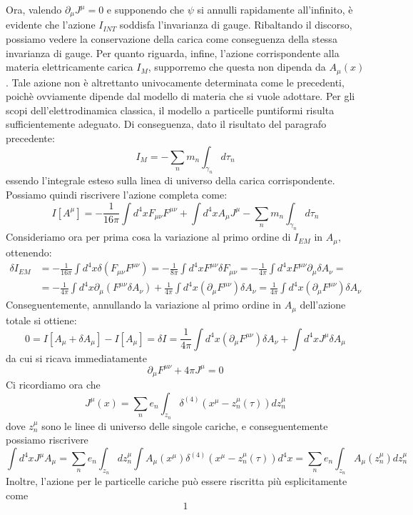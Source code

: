 \documentclass[a4paper,11pt]{book}
\theoremstyle{plain}
\theoremstyle{definition}
\begin{document}
Ora, valendo $\partial_{\mu}J^{\mu}=0$ e supponendo che $\psi$ si annulli rapidamente all'infinito, è evidente che l'azione $I_{INT}$ soddisfa l'invarianza di gauge. Ribaltando il discorso, possiamo vedere la conservazione della carica come conseguenza della stessa invarianza di gauge. Per quanto riguarda, infine, l'azione corrispondente alla materia elettricamente carica $I_M$, supporremo che questa non dipenda da $A_{\mu}(x)$. Tale azione non è altrettanto univocamente determinata come le precedenti, poichè ovviamente dipende dal modello di materia che si vuole adottare. Per gli scopi dell'elettrodinamica classica, il modello a particelle puntiformi risulta sufficientemente adeguato. Di conseguenza, dato il risultato del paragrafo precedente:
\[
I_M = -\sum_n m_n \int _{\gamma_n}d\tau_n
\] 
essendo l'integrale esteso sulla linea di universo della carica corrispondente. Possiamo quindi riscrivere l'azione completa come:
\[
I[A^{\mu}]=-\frac{1}{16\pi}\int d^4 xF_{\mu\nu}F^{\mu\nu}+\int d^4x A_{\mu}J^{\mu} -\sum_n m_n \int _{\gamma_n}d\tau_n
\]
Consideriamo ora per prima cosa la variazione al primo ordine di $I_{EM}$ in $A_{\mu}$, ottenendo:
\begin{align*}
\delta I_{EM} &= -\frac{1}{16\pi}\int d^4 x \delta(F_{\mu\nu}F^{\mu\nu}) = -\frac{1}{8\pi}\int d^4 x F^{\mu\nu}\delta F_{\mu\nu} = -\frac{1}{4\pi}\int d^4 x F^{\mu\nu}\partial_{\mu}\delta A_{\nu} = \\
&= -\frac{1}{4\pi}\int d^4 x\partial_{\mu}(F^{\mu\nu}\delta A_{\nu} ) + \frac{1}{4\pi}\int d^4x (\partial_{\mu}F^{\mu\nu})\delta A_{\nu} = \frac{1}{4\pi}\int d^4x (\partial_{\mu}F^{\mu\nu})\delta A_{\nu}
\end{align*}
Conseguentemente, annullando la variazione al primo ordine in $A_{\mu}$ dell'azione totale si ottiene:
\[
0 = I[A_{\mu}+\delta A_{\mu}] - I[A_{\mu}] = \delta I = \frac{1}{4\pi}\int d^4x (\partial_{\mu}F^{\mu\nu})\delta A_{\nu} + \int d^4 x J^{\mu}\delta A_{\mu}
\]
da cui si ricava immediatamente
\[
\partial_{\mu}F^{\mu\nu}+4\pi J^{\mu}=0
\]
Ci ricordiamo ora che 
\[
J^{\mu}(x) = \sum_n e_n \int _{z_n}\delta^{(4)}(x^{\mu}-z_n^{\mu}(\tau) ) dz_n^{\mu}
\]
dove $z_n^{\mu}$ sono le linee di universo delle singole cariche, e conseguentemente possiamo riscrivere
\[
\int d^4x J^{\mu} A_{\mu} = \sum_n e_n \int_{z_n} dz_n^{\mu} \int A_{\mu}(x^{\mu}) \delta^{(4)}(x^{\mu}-z_n^{\mu}(\tau) ) d^4x = \sum_n e_n \int_{z_n} A_{\mu}(z_n^{\mu})dz_n^{\mu}
\]
Inoltre, l'azione per le particelle cariche può essere riscritta più esplicitamente come
\[
1
\]
\end{document}

